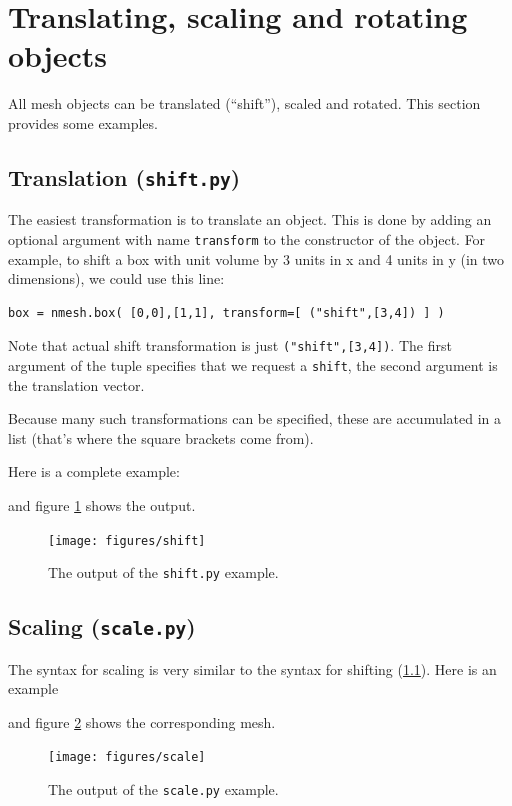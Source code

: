 \documentclass[10pt,a4paper]{book}
\newcommand{\py}[1]{\texttt{\color{blue}#1}}
\begin{document}
\section{Translating, scaling and rotating objects}


All mesh objects can be translated (``shift''), scaled and rotated.
This section provides some examples.



\subsection{Translation (\texttt{shift.py})}
\label{subsec:shifting}

The easiest transformation is to translate an object. This is done by adding an optional argument with name \py{transform} to the constructor of the object. For example, to shift a box with unit volume by 3 units in x and 4 units in y (in two dimensions), we could use this line:
\begin{lstlisting}
box = nmesh.box( [0,0],[1,1], transform=[ ("shift",[3,4]) ] )
\end{lstlisting}
Note that actual shift transformation is just \py{("shift",[3,4])}. The first argument of the tuple specifies that we request a \py{shift}, the second argument is the translation vector.

Because many such transformations can be specified, these are accumulated in a list (that's where the square brackets come from).

Here is a complete example:

and figure \ref{fig:shift} shows the output.
\begin{figure}[tbhp]
\centerline{\texttt{[image: figures/shift]}}
\caption{\label{fig:shift} The output of the \py{shift.py} example.}
\end{figure}


\subsection{Scaling (\texttt{scale.py})}

The syntax for scaling is very similar to the syntax for shifting (\ref{subsec:shifting}). Here is an example

and figure \ref{fig:scale} shows the corresponding mesh.
\begin{figure}[tbhp]
\centerline{\texttt{[image: figures/scale]}}
\caption{\label{fig:scale} The output of the \py{scale.py} example.}
\end{figure}
\end{document}
